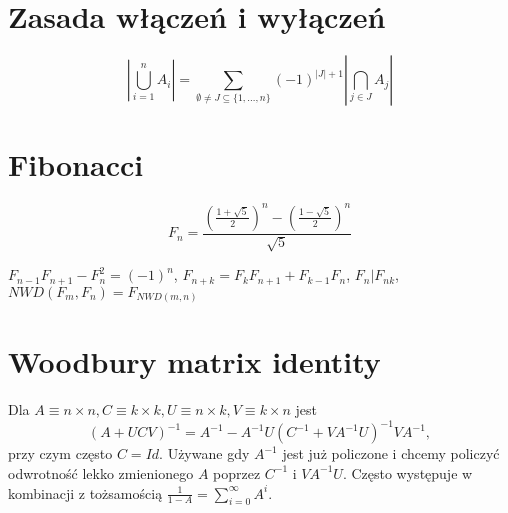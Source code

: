\section{Zasada włączeń i wyłączeń}

$$| \bigcup_{i=1}^n A_i | = \sum_{\emptyset \neq J \subseteq  \{1,\dots,n\}} (-1)^{|J|+1} | \bigcap_{j \in J} A_j | $$

\section{Fibonacci}

$$F_n = \frac{\left(\frac{1+\sqrt{5}}{2}\right)^n - \left(\frac{1-\sqrt{5}}{2}\right)^n}{\sqrt{5}}$$

$F_{n-1}F_{n+1}-F_n^2=(-1)^n$, $F_{n+k}=F_k F_{n+1} + F_{k-1} F_n$, $F_n | F_{nk}$, $NWD(F_m, F_n) = F_{NWD(m, n)}$

\section{Woodbury matrix identity}

Dla $A\equiv n\times n, C\equiv k\times k, U\equiv n\times k, V\equiv k\times n$
jest $$(A+UCV)^{-1} = A^{-1} - A^{-1}U(C^{-1}+VA^{-1}U)^{-1}VA^{-1},$$
przy czym często $C=Id$.
Używane gdy $A^{-1}$ jest już policzone i chcemy policzyć odwrotność lekko zmienionego $A$
poprzez $C^{-1}$ i $VA^{-1}U$.
Często występuje w kombinacji z tożsamością $\frac{1}{1-A} = \sum_{i=0}^\infty A^i$.
